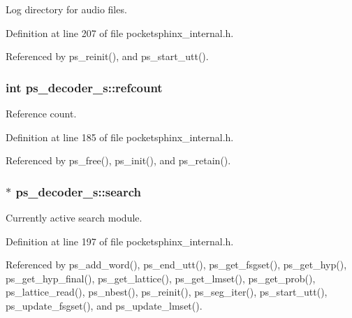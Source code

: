 Log directory for audio files. 



Definition at line 207 of file pocketsphinx\-\_\-internal.\-h.



Referenced by ps\-\_\-reinit(), and ps\-\_\-start\-\_\-utt().

\subsubsection[{refcount}]{\setlength{\rightskip}{0pt plus 5cm}int ps\-\_\-decoder\-\_\-s\-::refcount}\label{structps__decoder__s_aa5ab90180288b6c9039eb86b496f76aa}


Reference count. 



Definition at line 185 of file pocketsphinx\-\_\-internal.\-h.



Referenced by ps\-\_\-free(), ps\-\_\-init(), and ps\-\_\-retain().

\subsubsection[{search}]{$\ast$ ps\-\_\-decoder\-\_\-s\-::search}\label{structps__decoder__s_ad337270efc93613cf8dd7594f6515799}


Currently active search module. 



Definition at line 197 of file pocketsphinx\-\_\-internal.\-h.



Referenced by ps\-\_\-add\-\_\-word(), ps\-\_\-end\-\_\-utt(), ps\-\_\-get\-\_\-fsgset(), ps\-\_\-get\-\_\-hyp(), ps\-\_\-get\-\_\-hyp\-\_\-final(), ps\-\_\-get\-\_\-lattice(), ps\-\_\-get\-\_\-lmset(), ps\-\_\-get\-\_\-prob(), ps\-\_\-lattice\-\_\-read(), ps\-\_\-nbest(), ps\-\_\-reinit(), ps\-\_\-seg\-\_\-iter(), ps\-\_\-start\-\_\-utt(), ps\-\_\-update\-\_\-fsgset(), and ps\-\_\-update\-\_\-lmset().

